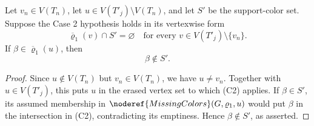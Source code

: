 \begin{lemma}
Let \(v_n\in V(T_n)\), let
\(u\in V(T'_j)\setminus V(T_n)\), and let \(S'\) be the support-color
set.  Suppose the Case 2 hypothesis holds in its vertexwise form
\[
 \overline{\varrho}_1(v)\cap S'=\varnothing
 \quad\text{for every }v\in V(T'_j)\setminus\{v_n\}.            \tag{C2}
\]
If \(\beta\in\overline{\varrho}_1(u)\), then
\[
                         \beta\notin S'.                       \tag{22}
\]
\end{lemma}
\begin{proof}
Since \(u\notin V(T_n)\) but \(v_n\in V(T_n)\), we have \(u\ne v_n\).
Together with \(u\in V(T'_j)\), this puts \(u\) in the erased vertex set
to which (C2) applies.  If \(\beta\in S'\), its assumed membership in
\(\noderef{MissingColors}(G,\varrho_1,u)\) would put \(\beta\) in the
intersection in (C2), contradicting its emptiness.  Hence
\(\beta\notin S'\), as asserted.
\end{proof}
